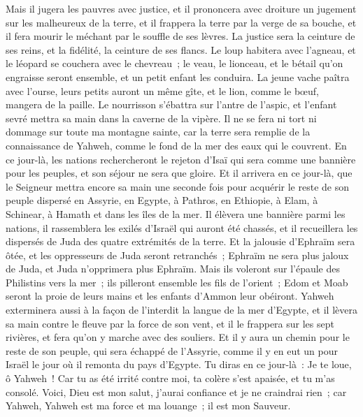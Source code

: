 \begin{multicols}{2}
Mais il jugera les pauvres avec justice, et il prononcera avec droiture un jugement sur les malheureux de la terre, et il frappera la terre par la verge de sa bouche, et il fera mourir le méchant par le souffle de ses lèvres.
La justice sera la ceinture de ses reins, et la fidélité, la ceinture de ses flancs.
Le loup habitera avec l'agneau, et le léopard se couchera avec le chevreau~; le veau, le lionceau, et le bétail qu'on engraisse seront ensemble, et un petit enfant les conduira.
La jeune vache paîtra avec l'ourse, leurs petits auront un même gîte, et le lion, comme le bœuf, mangera de la paille.
Le nourrisson s'ébattra sur l'antre de l'aspic, et l'enfant sevré mettra sa main dans la caverne de la vipère.
Il ne se fera ni tort ni dommage sur toute ma montagne sainte, car la terre sera remplie de la connaissance de Yahweh, comme le fond de la mer des eaux qui le couvrent.
En ce jour-là, les nations rechercheront le rejeton d'Isaï qui sera comme une bannière pour les peuples, et son séjour ne sera que gloire.
Et il arrivera en ce jour-là, que le Seigneur mettra encore sa main une seconde fois pour acquérir le reste de son peuple dispersé en Assyrie, en Egypte, à Pathros, en Ethiopie, à Elam, à Schinear, à Hamath et dans les îles de la mer.
Il élèvera une bannière parmi les nations, il rassemblera les exilés d'Israël qui auront été chassés, et il recueillera les dispersés de Juda des quatre extrémités de la terre.
Et la jalousie d'Ephraïm sera ôtée, et les oppresseurs de Juda seront retranchés~; Ephraïm ne sera plus jaloux de Juda, et Juda n'opprimera plus Ephraïm.
Mais ils voleront sur l'épaule des Philistins vers la mer~; ils pilleront ensemble les fils de l'orient~; Edom et Moab seront la proie de leurs mains et les enfants d'Ammon leur obéiront.
Yahweh exterminera aussi à la façon de l'interdit la langue de la mer d'Egypte, et il lèvera sa main contre le fleuve par la force de son vent, et il le frappera sur les sept rivières, et fera qu'on y marche avec des souliers.
Et il y aura un chemin pour le reste de son peuple, qui sera échappé de l'Assyrie, comme il y en eut un pour Israël le jour où il remonta du pays d'Egypte.
\VerseOne{}Tu diras en ce jour-là~: Je te loue, ô Yahweh~! Car tu as été irrité contre moi, ta colère s'est apaisée, et tu m'as consolé.
Voici, Dieu est mon salut, j'aurai confiance et je ne craindrai rien~; car Yahweh, Yahweh est ma force et ma louange~; il est mon Sauveur.

\end{multicols}
